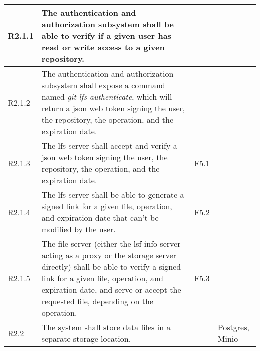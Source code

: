 \begin{landscape}
\begin{longtable}{|p{1cm}|p{19cm}|p{2cm}|p{3cm}|}
        R2.1.1                              & The authentication and authorization subsystem shall be able to verify if a given user has read or write access to a given repository.                                                                                                                                                &                       &                                          \\ \hline
        R2.1.2                              & The authentication and authorization subsystem shall expose a command named \textit{git-lfs-authenticate}, which will return a json web token signing the user, the repository, the operation, and the expiration date.                                                               &                       &                                          \\ \hline
        R2.1.3                              & The lfs server shall accept and verify a json web token signing the user, the repository, the operation, and the expiration date.                                                                                                                                                     & F5.1                  &                                          \\ \hline
        R2.1.4                              & The lfs server shall be able to generate a signed link for a given file, operation, and expiration date that can't be modified by the user.                                                                                                                                           & F5.2                  &                                          \\ \hline
        R2.1.5                              & The file server (either the lsf info server acting as a proxy or the storage server directly) shall be able to verify a signed link for a given file, operation, and expiration date, and serve or accept the requested file, depending on the operation.                             & F5.3                  &                                          \\ \hline
        \rowcolor[HTML]{DDDDDD}        R2.2 & The system shall store data files in a separate storage location.                                                                                                                                                                                                                     &                       & Postgres, Minio                          \\ \hline

\end{longtable}
\end{landscape}
